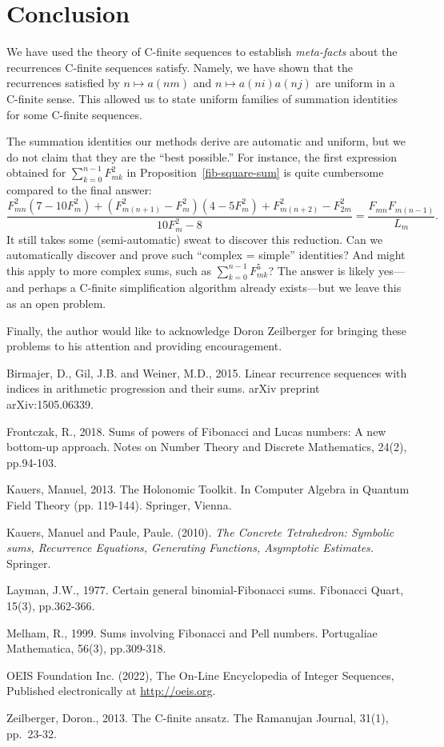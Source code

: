 \documentclass[12pt]{article}
\begin{document}
\section{Conclusion}
We have used the theory of C-finite sequences to establish \emph{meta-facts}
about the recurrences C-finite sequences satisfy. Namely, we have shown that
the recurrences satisfied by $n \mapsto a(nm)$ and $n \mapsto a(ni) a(nj)$ are
uniform in a C-finite sense. This allowed us to state uniform families of
summation identities for some C-finite sequences.

The summation identities our methods derive are automatic and uniform, but we
do not claim that they are the ``best possible.'' For instance, the first
expression obtained for $\sum_{k = 0}^{n - 1} F_{mk}^2$ in
Proposition~\ref{fib-square-sum} is quite cumbersome compared to the final
answer:
\begin{equation*}
    \frac{F_{mn}^2 (7 - 10 F_m^2) + (F_{m(n + 1)}^2 - F_m^2) (4 - 5 F_m^2) + F_{m(n + 2)}^2 - F_{2m}^2}{10 F_m^2 - 8}
    =
    \frac{F_{mn} F_{m(n - 1)}}{L_m}.
\end{equation*}
It still takes some (semi-automatic) sweat to discover this reduction. Can we
automatically discover and prove such ``complex = simple'' identities? And
might this apply to more complex sums, such as $\sum_{k = 0}^{n - 1} F_{mk}^5$?
The answer is likely yes---and perhaps a C-finite simplification algorithm
already exists---but we leave this as an open problem.

Finally, the author would like to acknowledge Doron Zeilberger for bringing
these problems to his attention and providing encouragement.

\begin{thebibliography}{10}
Birmajer, D., Gil, J.B. and Weiner, M.D., 2015. Linear recurrence sequences
with indices in arithmetic progression and their sums. arXiv preprint
arXiv:1505.06339.

Frontczak, R., 2018. Sums of powers of Fibonacci and Lucas numbers: A new bottom-up approach. Notes on Number Theory and Discrete Mathematics, 24(2), pp.94-103.

Kauers, Manuel, 2013. The Holonomic Toolkit. In Computer Algebra in Quantum
Field Theory (pp. 119-144). Springer, Vienna.

Kauers, Manuel and Paule, Paule. (2010). \emph{The Concrete Tetrahedron:
    Symbolic sums, Recurrence Equations, Generating Functions, Asymptotic
Estimates.} Springer.

Layman, J.W., 1977. Certain general binomial-Fibonacci sums. Fibonacci Quart, 15(3), pp.362-366.

Melham, R., 1999. Sums involving Fibonacci and Pell numbers. Portugaliae Mathematica, 56(3), pp.309-318.

OEIS Foundation Inc. (2022), The On-Line Encyclopedia of Integer Sequences,
Published electronically at \url{http://oeis.org}.

Zeilberger, Doron., 2013. The C-finite ansatz. The Ramanujan Journal, 31(1),
pp.~23-32.
\end{thebibliography}
\end{document}
